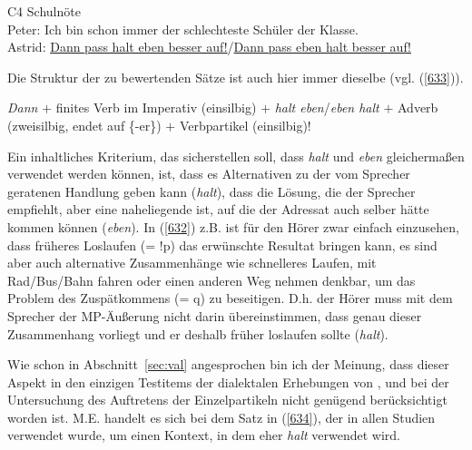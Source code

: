 \begin{exe}
	\ex\label{632} 
	C4 Schulnöte\\
	Peter: Ich bin schon immer der schlechteste Schüler der Klasse.\\
	Astrid: \underline{Dann pass halt eben besser auf!}/\underline{Dann pass eben halt besser auf!}
\end{exe}
Die Struktur der zu bewertenden Sätze ist auch hier immer dieselbe (vgl. (\ref{633})).

\begin{exe}
	\ex\label{633} 
	\textit{Dann} $\plus$ finites Verb im Imperativ (einsilbig) $\plus$ \textit{halt eben}/\textit{eben halt} $\plus$ Adverb 		(zweisilbig, endet auf \{-er\}) $\plus$ Verbpartikel (einsilbig)!
\end{exe}
Ein inhaltliches Kriterium, das sicherstellen soll, dass \textit{halt} und \textit{eben} gleichermaßen verwendet werden können, ist, dass es Alternativen zu der vom Sprecher geratenen Handlung geben kann (\textit{halt}), dass die Lösung, die der Sprecher empfiehlt, aber eine naheliegende ist, auf die der Adressat auch selber hätte kommen können (\textit{eben}). In (\ref{632}) z.B. ist für den Hörer zwar einfach einzusehen, dass früheres Loslaufen (= !p) das erwünschte Resultat bringen kann, es sind aber auch alternative Zusammenhänge wie schnelleres Laufen, mit Rad/Bus/Bahn fahren oder einen anderen Weg nehmen denkbar, um das Problem des Zuspätkommens (= q) zu beseitigen. D.h. der Hörer muss mit dem Sprecher der MP-Äußerung nicht darin übereinstimmen, dass genau dieser Zusammenhang vorliegt und er deshalb früher loslaufen sollte (\textit{halt}).

Wie schon in Abschnitt~\ref{sec:val} angesprochen bin ich der Meinung, dass dieser Aspekt in den einzigen Testitems der dialektalen Erhebungen von \citet{Eichhoff1978}, \citet{Elspass2005} und \citet{Protze1997} bei der Untersuchung des Auftretens der Einzelpartikeln nicht genügend berücksichtigt worden ist. M.E. handelt es sich bei dem Satz in (\ref{634}), der in allen Studien verwendet wurde, um einen Kontext, in dem eher \textit{halt} verwendet wird.

